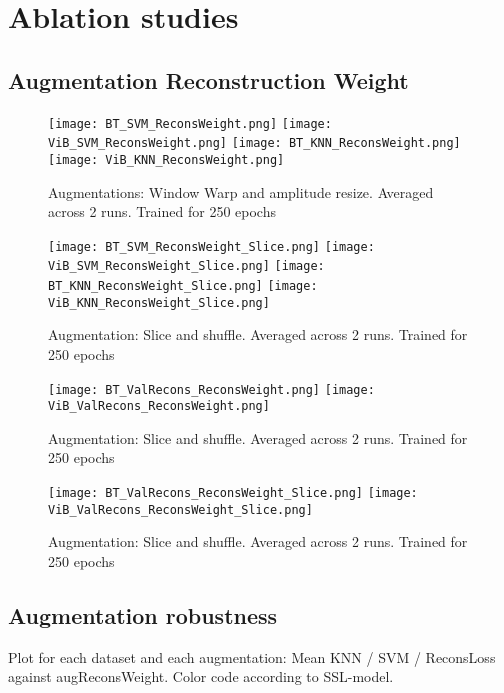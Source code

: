 \documentclass[../../thesis.tex]{subfiles}
\begin{document}
\section{Ablation studies}

\subsection{Augmentation Reconstruction Weight}

\begin{figure}[h]
    \texttt{[image: BT\_SVM\_ReconsWeight.png]}
    \texttt{[image: ViB\_SVM\_ReconsWeight.png]}
    \texttt{[image: BT\_KNN\_ReconsWeight.png]}
    \texttt{[image: ViB\_KNN\_ReconsWeight.png]}
    \centering  
    \caption{Augmentations: Window Warp and amplitude resize. Averaged across 2 runs. Trained for 250 epochs}  
\end{figure}

\begin{figure}[h]
    \texttt{[image: BT\_SVM\_ReconsWeight\_Slice.png]}
    \texttt{[image: ViB\_SVM\_ReconsWeight\_Slice.png]}
    \texttt{[image: BT\_KNN\_ReconsWeight\_Slice.png]}
    \texttt{[image: ViB\_KNN\_ReconsWeight\_Slice.png]}

    \caption{Augmentation: Slice and shuffle. Averaged across 2 runs. Trained for 250 epochs}  
\end{figure}

\begin{figure}[h]
    \texttt{[image: BT\_ValRecons\_ReconsWeight.png]}
    \texttt{[image: ViB\_ValRecons\_ReconsWeight.png]}
    \caption{Augmentation: Slice and shuffle. Averaged across 2 runs. Trained for 250 epochs}  
\end{figure}
\begin{figure}[h]
    \texttt{[image: BT\_ValRecons\_ReconsWeight\_Slice.png]}
    \texttt{[image: ViB\_ValRecons\_ReconsWeight\_Slice.png]}
    \caption{Augmentation: Slice and shuffle. Averaged across 2 runs. Trained for 250 epochs}  
\end{figure}
\subsection{Augmentation robustness}

Plot for each dataset and each augmentation: 
Mean KNN / SVM / ReconsLoss against augReconsWeight. 
Color code according to SSL-model.
\end{document}
